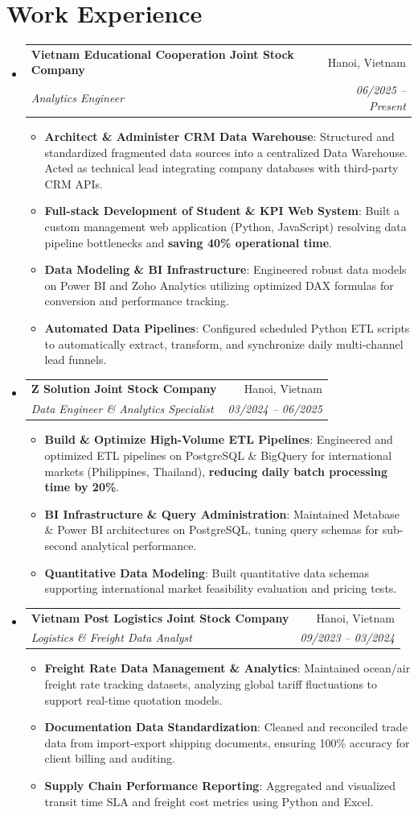 \documentclass[letterpaper,11pt]{article}
\makeatletter
\newcommand{\resumeItem}[1]{
  \item\small{
    {#1 \vspace{1pt}}
  }
}
\newcommand{\resumeSubheading}[4]{
  \vspace{2pt}\item
    \begin{tabular*}{\textwidth}[t]{l@{\extracolsep{\fill}}r}
      \textbf{#1} & #2 \\
      \textit{\small#3} & \textit{\small #4} \\
    \end{tabular*}\vspace{-2pt}
}
\newcommand{\resumeSubHeadingListStart}{\begin{itemize}[leftmargin=0.15in, label={}]}
\newcommand{\resumeSubHeadingListEnd}{\end{itemize}}
\newcommand{\resumeItemListStart}{\begin{itemize}[leftmargin=0.15in, itemsep=2.5pt, topsep=2pt, parsep=1.5pt]}
\newcommand{\resumeItemListEnd}{\end{itemize}\vspace{2pt}}
\makeatother
\begin{document}
\section*{Work Experience}
  \resumeSubHeadingListStart
        \resumeSubheading
      {Vietnam Educational Cooperation Joint Stock Company}{Hanoi, Vietnam}
      {Analytics Engineer}{06/2025 -- Present}
      \resumeItemListStart
      \resumeItem{\textbf{Architect \& Administer CRM Data Warehouse}: Structured and standardized fragmented data sources into a centralized Data Warehouse. Acted as technical lead integrating company databases with third-party CRM APIs.}
      \resumeItem{\textbf{Full-stack Development of Student \& KPI Web System}: Built a custom management web application (Python, JavaScript) resolving data pipeline bottlenecks and \textbf{saving 40\% operational time}.}
      \resumeItem{\textbf{Data Modeling \& BI Infrastructure}: Engineered robust data models on Power BI and Zoho Analytics utilizing optimized DAX formulas for conversion and performance tracking.}
      \resumeItem{\textbf{Automated Data Pipelines}: Configured scheduled Python ETL scripts to automatically extract, transform, and synchronize daily multi-channel lead funnels.}
      \resumeItemListEnd
    \resumeSubheading
      {Z Solution Joint Stock Company}{Hanoi, Vietnam}
      {Data Engineer \& Analytics Specialist}{03/2024 -- 06/2025}
      \resumeItemListStart
      \resumeItem{\textbf{Build \& Optimize High-Volume ETL Pipelines}: Engineered and optimized ETL pipelines on PostgreSQL \& BigQuery for international markets (Philippines, Thailand), \textbf{reducing daily batch processing time by 20\%}.}
      \resumeItem{\textbf{BI Infrastructure \& Query Administration}: Maintained Metabase \& Power BI architectures on PostgreSQL, tuning query schemas for sub-second analytical performance.}
      \resumeItem{\textbf{Quantitative Data Modeling}: Built quantitative data schemas supporting international market feasibility evaluation and pricing tests.}
      \resumeItemListEnd
    \resumeSubheading
      {Vietnam Post Logistics Joint Stock Company}{Hanoi, Vietnam}
      {Logistics \& Freight Data Analyst}{09/2023 -- 03/2024}
      \resumeItemListStart
      \resumeItem{\textbf{Freight Rate Data Management \& Analytics}: Maintained ocean/air freight rate tracking datasets, analyzing global tariff fluctuations to support real-time quotation models.}
      \resumeItem{\textbf{Documentation Data Standardization}: Cleaned and reconciled trade data from import-export shipping documents, ensuring 100\% accuracy for client billing and auditing.}
      \resumeItem{\textbf{Supply Chain Performance Reporting}: Aggregated and visualized transit time SLA and freight cost metrics using Python and Excel.}
      \resumeItemListEnd
  \resumeSubHeadingListEnd
\end{document}
